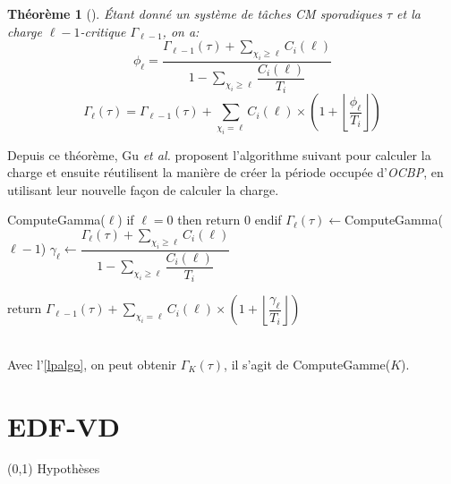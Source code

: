 \documentclass[12pt,a4paper,oneside]{book}
\theoremstyle{break}
\theoremstyle{breakplain}
\newtheorem{theo}{Théorème}[chapter]
\begin{document}
\begin{theo}[\cite{gu2013improving}]
Étant donné un système de tâches CM sporadiques $\tau$ et la charge $\ell-1$-critique $\Gamma_{\ell-1}$, on a:
\begin{equation}
\phi_\ell = \dfrac{\Gamma_{\ell-1}(\tau) + \sum_{\chi_i \ge \ell} C_i(\ell)}{1 - \sum_{\chi_i \ge \ell} \dfrac{C_i(\ell)}{T_i}}
\end{equation}
\begin{equation}
\Gamma_\ell(\tau) = \Gamma_{\ell-1}(\tau) + \underset{\chi_i = \ell}{\sum}C_i(\ell) \times \left( 1 + \left\lfloor \dfrac{\phi_\ell}{T_i} \right\rfloor \right)
\end{equation}
\end{theo}

Depuis ce théorème, Gu \textit{et al.} proposent l'algorithme suivant pour calculer la charge et ensuite réutilisent la manière de créer la période occupée d'\textit{OCBP}, en utilisant leur nouvelle façon de calculer la charge.

\begin{algorithm}[caption={Calcul de la charge $\ell$-critique},label={lpalgo},mathescape=true]
ComputeGamma($\ell$)
 if $\ell = 0$ then
  return 0
 endif
 $\displaystyle \Gamma_\ell(\tau) \gets $ComputeGamma($\ell-1$)
 $\displaystyle \gamma_\ell \gets \dfrac{\Gamma_\ell(\tau) + \sum_{\chi_i \geq \ell} C_i(\ell)}{1-\sum_{\chi_i \geq \ell} \dfrac{C_i(\ell)}{T_i}}$
 
 return $\displaystyle \Gamma_{\ell-1}(\tau) + \sum_{\chi_i = \ell}C_i(\ell) \times \left( 1 + \left\lfloor \dfrac{\gamma_\ell}{T_i} \right\rfloor \right)$
       
\end{algorithm}
\phantom\\
 Avec l'\autoref{lpalgo}, on peut obtenir $\Gamma_K(\tau)$, il s'agit de ComputeGamme($K$).\\

\section{EDF-VD}
\label{edfvd}

\begin{center}
\boxput*(0,1){
\colorbox{white}{Hypothèses}
}{
\setlength{\fboxsep}{6pt}
}
\end{center}
\end{document}
